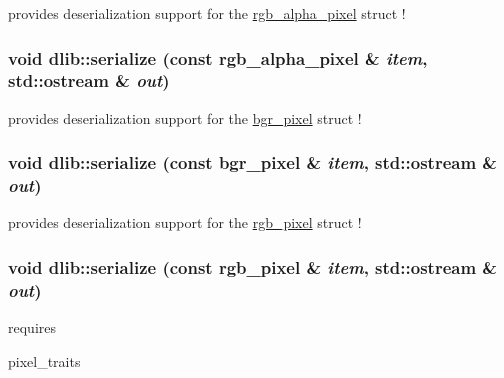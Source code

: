 \label{namespacedlib_add718e65e3023a2abd8eb04200e81b52}
provides deserialization support for the \hyperlink{structdlib_1_1rgb__alpha__pixel}{rgb\_\-alpha\_\-pixel} struct ! \hypertarget{namespacedlib_abbbd5224f9387eef940579cdf3fd4a13}{
\subsubsection[{serialize}]{\setlength{\rightskip}{0pt plus 5cm}void dlib::serialize (const rgb\_\-alpha\_\-pixel \& {\em item}, \/  std::ostream \& {\em out})}}
\label{namespacedlib_abbbd5224f9387eef940579cdf3fd4a13}
provides deserialization support for the \hyperlink{structdlib_1_1bgr__pixel}{bgr\_\-pixel} struct ! \hypertarget{namespacedlib_aefd5ce982b258dc62d2c4a657278a492}{
\subsubsection[{serialize}]{\setlength{\rightskip}{0pt plus 5cm}void dlib::serialize (const bgr\_\-pixel \& {\em item}, \/  std::ostream \& {\em out})}}
\label{namespacedlib_aefd5ce982b258dc62d2c4a657278a492}
provides deserialization support for the \hyperlink{structdlib_1_1rgb__pixel}{rgb\_\-pixel} struct ! \hypertarget{namespacedlib_ac78b72e65600a0d25ac3224539794fc2}{
\subsubsection[{serialize}]{\setlength{\rightskip}{0pt plus 5cm}void dlib::serialize (const rgb\_\-pixel \& {\em item}, \/  std::ostream \& {\em out})}}
\label{namespacedlib_ac78b72e65600a0d25ac3224539794fc2}
requires
\begin{DoxyItemize}
\item pixel\_\-traits
\end{DoxyItemize}

